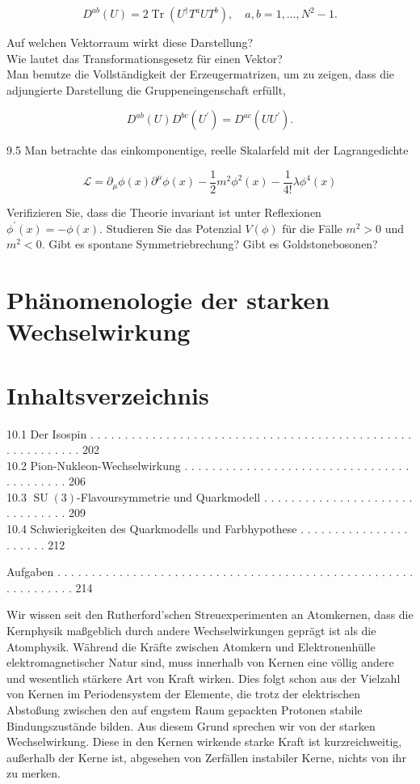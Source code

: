 \documentclass[10pt, letterpaper]{article}
\begin{document}
$$
D^{a b}(U)=2 \operatorname{Tr}\left(U^{\dagger} T^{a} U T^{b}\right), \quad a, b=1, \ldots, N^{2}-1 .
$$

Auf welchen Vektorraum wirkt diese Darstellung?\\
Wie lautet das Transformationsgesetz für einen Vektor?\\
Man benutze die Vollständigkeit der Erzeugermatrizen, um zu zeigen, dass die adjungierte Darstellung die Gruppeneingenschaft erfüllt,

$$
D^{a b}(U) D^{b c}\left(U^{\prime}\right)=D^{a c}\left(U U^{\prime}\right) .
$$

9.5 Man betrachte das einkomponentige, reelle Skalarfeld mit der Lagrangedichte

$$
\mathscr{L}=\partial_{\mu} \phi(x) \partial^{\mu} \phi(x)-\frac{1}{2} m^{2} \phi^{2}(x)-\frac{1}{4!} \lambda \phi^{4}(x)
$$

Verifizieren Sie, dass die Theorie invariant ist unter Reflexionen $\phi^{\prime}(x)=-\phi(x)$. Studieren Sie das Potenzial $V(\phi)$ für die Fälle $m^{2}>0$ und $m^{2}<0$. Gibt es spontane Symmetriebrechung? Gibt es Goldstonebosonen?

\section*{Phänomenologie der starken Wechselwirkung}
\section*{Inhaltsverzeichnis}
10.1 Der Isospin . . . . . . . . . . . . . . . . . . . . . . . . . . . . . . . . . . . . . . . . . . . . . . . . . . . . . . . . . . 202\\
10.2 Pion-Nukleon-Wechselwirkung . . . . . . . . . . . . . . . . . . . . . . . . . . . . . . . . . . . . . . . . . . 206\\
10.3 $\operatorname{SU}(3)$-Flavoursymmetrie und Quarkmodell . . . . . . . . . . . . . . . . . . . . . . . . . . . . . . . 209\\
10.4 Schwierigkeiten des Quarkmodells und Farbhypothese . . . . . . . . . . . . . . . . . . . . . . 212

Aufgaben . . . . . . . . . . . . . . . . . . . . . . . . . . . . . . . . . . . . . . . . . . . . . . . . . . . . . . . . . . . . . . 214

Wir wissen seit den Rutherford'schen Streuexperimenten an Atomkernen, dass die Kernphysik maßgeblich durch andere Wechselwirkungen geprägt ist als die Atomphysik. Während die Kräfte zwischen Atomkern und Elektronenhülle elektromagnetischer Natur sind, muss innerhalb von Kernen eine völlig andere und wesentlich stärkere Art von Kraft wirken. Dies folgt schon aus der Vielzahl von Kernen im Periodensystem der Elemente, die trotz der elektrischen Abstoßung zwischen den auf engstem Raum gepackten Protonen stabile Bindungszustände bilden. Aus diesem Grund sprechen wir von der starken Wechselwirkung. Diese in den Kernen wirkende starke Kraft ist kurzreichweitig, außerhalb der Kerne ist, abgesehen von Zerfällen instabiler Kerne, nichts von ihr zu merken.
\end{document}
